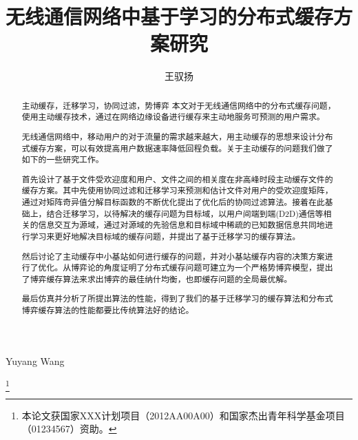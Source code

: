 \documentclass[bachelor]{seuthesis} %
\begin{document}

\title{无线通信网络中基于学习的分布式缓存方案研究}{}{}{}
\author{王驭扬}{Yuyang Wang}

\address{无线谷A5楼2层}
\thanks{本论文获国家XXX计划项目（2012AA00A00）和国家杰出青年科学基金项目（01234567）资助。}
\maketitle

\begin{abstract}{主动缓存，迁移学习，协同过滤，势博弈}
本文对于无线通信网络中的分布式缓存问题，使用主动缓存技术，通过在网络边缘设备进行缓存来主动地服务可预测的用户需求。\par
无线通信网络中，移动用户的对于流量的需求越来越大，用主动缓存的思想来设计分布式缓存方案，可以有效提高用户数据速率降低回程负载。关于主动缓存的问题我们做了如下的一些研究工作。\par
首先设计了基于文件受欢迎度和用户、文件之间的相关度在非高峰时段主动缓存文件的缓存方案。其中先使用协同过滤和迁移学习来预测和估计文件对用户的受欢迎度矩阵，通过对矩阵奇异值分解目标函数的不断优化提出了优化后的协同过滤算法。接着在此基础上，结合迁移学习，以待解决的缓存问题为目标域，以用户间端到端(D2D)通信等相关的信息交互为源域，通过对源域的先验信息和目标域中稀疏的已知数据信息共同地进行学习来更好地解决目标域的缓存问题，并提出了基于迁移学习的缓存算法。\par
然后讨论了主动缓存中小基站如何进行缓存的问题，并对小基站缓存内容的决策方案进行了优化。从博弈论的角度证明了分布式缓存问题可建立为一个严格势博弈模型，提出了博弈缓存算法来求出博弈的最佳纳什均衡，也即缓存问题的全局最优解。\par
最后仿真并分析了所提出算法的性能，得到了我们的基于迁移学习的缓存算法和分布式博弈缓存算法的性能都要比传统算法好的结论。
\end{abstract}
\end{document}
